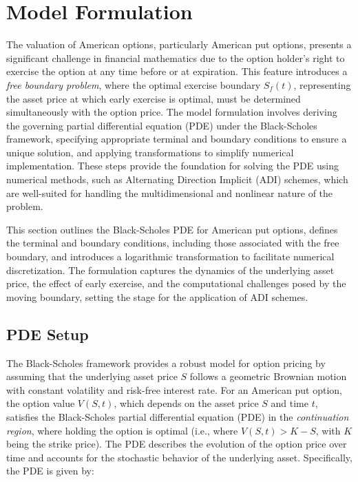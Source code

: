 \documentclass{article}
\begin{document}
\section{Model Formulation}
The valuation of American options, particularly American put options, presents a significant challenge in financial mathematics due to the option holder's right to exercise the option at any time before or at expiration. This feature introduces a \emph{free boundary problem}, where the optimal exercise boundary \( S_f(t) \), representing the asset price at which early exercise is optimal, must be determined simultaneously with the option price. The model formulation involves deriving the governing partial differential equation (PDE) under the Black-Scholes framework, specifying appropriate terminal and boundary conditions to ensure a unique solution, and applying transformations to simplify numerical implementation. These steps provide the foundation for solving the PDE using numerical methods, such as Alternating Direction Implicit (ADI) schemes, which are well-suited for handling the multidimensional and nonlinear nature of the problem.

This section outlines the Black-Scholes PDE for American put options, defines the terminal and boundary conditions, including those associated with the free boundary, and introduces a logarithmic transformation to facilitate numerical discretization. The formulation captures the dynamics of the underlying asset price, the effect of early exercise, and the computational challenges posed by the moving boundary, setting the stage for the application of ADI schemes.

\subsection{PDE Setup}
The Black-Scholes framework provides a robust model for option pricing by assuming that the underlying asset price \( S \) follows a geometric Brownian motion with constant volatility and risk-free interest rate. For an American put option, the option value \( V(S, t) \), which depends on the asset price \( S \) and time \( t \), satisfies the Black-Scholes partial differential equation (PDE) in the \emph{continuation region}, where holding the option is optimal (i.e., where \( V(S, t) > K - S \), with \( K \) being the strike price). The PDE describes the evolution of the option price over time and accounts for the stochastic behavior of the underlying asset. Specifically, the PDE is given by:
\end{document}
